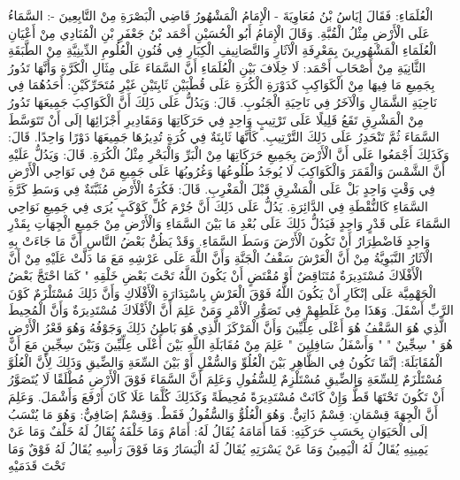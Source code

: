الْعُلَمَاءِ: فَقَالَ إيَاسُ بْنُ مُعَاوِيَةَ - الْإِمَامُ الْمَشْهُورُ قَاضِي الْبَصْرَةِ مِنْ التَّابِعِينَ -: السَّمَاءُ عَلَى الْأَرْضِ مِثْلُ الْقُبَّةِ. وَقَالَ الْإِمَامُ أَبُو الْحُسَيْنِ أَحْمَد بْنُ جَعْفَرِ بْنِ الْمُنَادِي مِنْ أَعْيَانِ الْعُلَمَاءِ الْمَشْهُورِينَ بِمَعْرِفَةِ الْآثَارِ وَالتَّصَانِيفِ الْكِبَارِ فِي فُنُونِ الْعُلُومِ الدِّينِيَّةِ مِنْ الطَّبَقَةِ الثَّانِيَةِ مِنْ أَصْحَابِ أَحْمَد: لَا خِلَافَ بَيْنِ الْعُلَمَاءِ أَنَّ السَّمَاءَ عَلَى مِثَالِ الْكَرَّةِ وَأَنَّهَا تَدُورُ بِجَمِيعِ مَا فِيهَا مِنْ الْكَوَاكِبِ كَدَوْرَةِ الْكُرَةِ عَلَى قُطْبَيْنِ ثَابِتَيْنِ غَيْرِ مُتَحَرِّكَيْنِ: أَحَدُهُمَا فِي نَاحِيَةِ الشَّمَالِ وَالْآخَرُ فِي نَاحِيَةِ الْجَنُوبِ. قَالَ: وَيَدُلُّ عَلَى ذَلِكَ أَنَّ الْكَوَاكِبَ جَمِيعَهَا تَدُورُ مِنْ الْمَشْرِقِ تَقَعُ قَلِيلًا عَلَى تَرْتِيبٍ وَاحِدٍ فِي حَرَكَاتِهَا وَمَقَادِيرِ أَجْزَائِهَا إلَى أَنْ تَتَوَسَّطَ السَّمَاءَ ثُمَّ تَنْحَدِرُ عَلَى ذَلِكَ التَّرْتِيبِ. كَأَنَّهَا ثَابِتَةٌ فِي كُرَةٍ تُدِيرُهَا جَمِيعَهَا دَوْرًا وَاحِدًا. قَالَ: وَكَذَلِكَ أَجْمَعُوا عَلَى أَنَّ الْأَرْضَ بِجَمِيعِ حَرَكَاتِهَا مِنْ الْبَرِّ وَالْبَحْرِ مِثْلُ الْكُرَةِ. قَالَ: وَيَدُلُّ عَلَيْهِ أَنَّ الشَّمْسَ وَالْقَمَرَ وَالْكَوَاكِبَ لَا يُوجَدُ طُلُوعُهَا وَغُرُوبُهَا عَلَى جَمِيعِ مَنْ فِي نَوَاحِي الْأَرْضِ فِي وَقْتٍ وَاحِدٍ بَلْ عَلَى الْمَشْرِقِ قَبْلَ الْمَغْرِبِ. قَالَ: فَكُرَةُ الْأَرْضِ مُثَبَّتَةٌ فِي وَسَطِ كَرَّةِ السَّمَاءِ كَالنُّقْطَةِ فِي الدَّائِرَةِ. يَدُلُّ عَلَى ذَلِكَ أَنَّ جُرْمَ كُلِّ كَوْكَبٍ يُرَى فِي جَمِيعِ نَوَاحِي السَّمَاءَ عَلَى قَدْرٍ وَاحِدٍ فَيَدُلُّ ذَلِكَ عَلَى بُعْدِ مَا بَيْنَ السَّمَاءِ وَالْأَرْضِ مِنْ جَمِيعِ الْجِهَاتِ بِقَدْرِ وَاحِدٍ فَاضْطِرَارُ أَنْ تَكُونَ الْأَرْضَ وَسَطَ السَّمَاءِ. وَقَدْ يَظُنُّ بَعْضُ النَّاسِ أَنَّ مَا جَاءَتْ بِهِ الْآثَارُ النَّبَوِيَّةُ مِنْ أَنَّ الْعَرْشَ سَقْفُ الْجَنَّةِ وَأَنَّ اللَّهَ عَلَى عَرْشِهِ مَعَ مَا دَلَّتْ عَلَيْهِ مِنْ أَنَّ الْأَفْلَاكَ مُسْتَدِيرَةٌ مُتَنَاقِضٌ أَوْ مُقْتَضٍ أَنْ يَكُونَ اللَّهُ تَحْتَ بَعْضِ خَلْقِهِ " كَمَا احْتَجَّ بَعْضُ الْجَهْمِيَّة عَلَى إنْكَارِ أَنْ يَكُونَ اللَّهُ فَوْقَ الْعَرْشِ بِاسْتِدَارَةِ الْأَفْلَاكِ وَأَنَّ ذَلِكَ مُسْتَلْزَمٌ كَوْنَ الرَّبِّ أَسْفَلَ. وَهَذَا مِنْ غَلَطِهِمْ فِي تَصَوُّرِ الْأَمْرِ وَمَنْ عَلِمَ أَنَّ الْأَفْلَاكَ مُسْتَدِيرَةٌ وَأَنَّ الْمُحِيطَ الَّذِي هُوَ السَّقْفُ هُوَ أَعْلَى عِلِّيِّينَ وَأَنَّ الْمَرْكَزَ الَّذِي هُوَ بَاطِنُ ذَلِكَ وَجَوْفُهُ وَهُوَ قَعْرُ الْأَرْضِ هُوَ " سِجِّينٌ " " وَأَسْفَلُ سَافِلِينَ " عَلِمَ مِنْ مُقَابَلَةِ اللَّهِ بَيْنَ أَعْلَى عِلِّيِّينَ وَبَيْنَ سِجِّينٍ مَعَ أَنَّ الْمُقَابَلَةَ: إنَّمَا تَكُونُ فِي الظَّاهِرِ بَيْنَ الْعُلُوِّ وَالسُّفْلِ أَوْ بَيْنَ السِّعَةِ وَالضِّيقِ وَذَلِكَ لِأَنَّ الْعُلُوَّ مُسْتَلْزَمٌ لِلسِّعَةِ وَالضِّيقِ مُسْتَلْزِمٌ لِلسُّفُولِ وَعَلِمَ أَنَّ السَّمَاءَ فَوْقَ الْأَرْضِ مُطْلَقًا لَا يُتَصَوَّرُ أَنْ تَكُونَ تَحْتَهَا قَطُّ وَإِنْ كَانَتْ مُسْتَدِيرَةً مُحِيطَةً وَكَذَلِكَ كُلَّمَا عَلَا كَانَ أَرْفَعَ وَأَشْمَلَ. وَعَلِمَ أَنَّ الْجِهَةَ قِسْمَانِ: قِسْمٌ ذَاتِيٌّ. وَهُوَ الْعُلُوُّ وَالسُّفُولُ فَقَطْ. وَقِسْمٌ إضَافِيٌّ: وَهُوَ مَا يُنْسَبُ إلَى الْحَيَوَانِ بِحَسَبِ حَرَكَتِهِ: فَمَا أَمَامَهُ يُقَالُ لَهُ: أَمَامٌ وَمَا خَلْفَهُ يُقَالُ لَهُ خَلْفٌ وَمَا عَنْ يَمِينِهِ يُقَالُ لَهُ الْيَمِينُ وَمَا عَنْ يَسْرَتِهِ يُقَالُ لَهُ الْيَسَارُ وَمَا فَوْقَ رَأْسِهِ يُقَالُ لَهُ فَوْقٌ وَمَا تَحْتَ قَدَمَيْهِ 